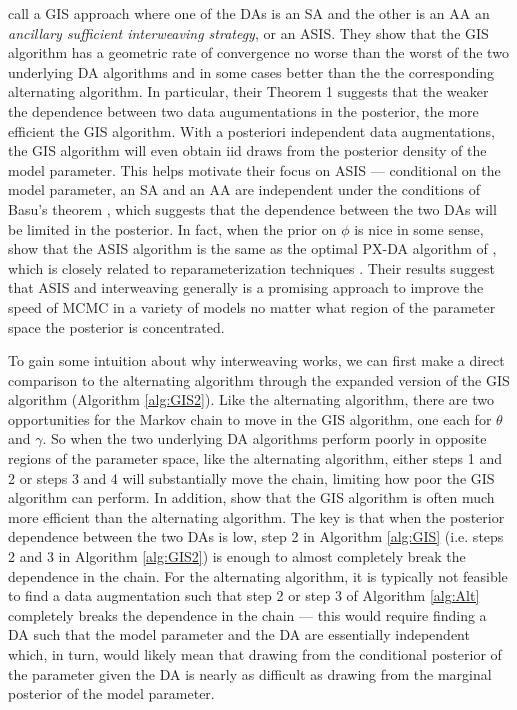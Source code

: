 \documentclass{article}
\begin{document}
 call a GIS approach where one of the DAs is an SA and the other is an AA an {\it ancillary sufficient interweaving strategy}, or an ASIS. They show that the GIS algorithm has a geometric rate of convergence no worse than the worst of the two underlying DA algorithms and in some cases better than the the corresponding alternating algorithm. In particular, their Theorem 1 suggests that the weaker the dependence between two data augumentations in the posterior, the more efficient the GIS algorithm. With a posteriori independent data augmentations, the GIS algorithm will even obtain iid draws from the posterior density of the model parameter. This helps motivate their focus on ASIS --- conditional on the model parameter, an SA and an AA are independent under the conditions of Basu's theorem \cite{basu1955statistics}, which suggests that the dependence between the two DAs will be limited in the posterior. In fact, when the prior on $\phi$ is nice in some sense,  show that the ASIS algorithm is the same as the optimal PX-DA algorithm of , which is closely related to reparameterization techniques  \cite{hobert2008theoretical}. Their results suggest that ASIS and interweaving generally is a promising approach to improve the speed of MCMC in a variety of models no matter what region of the parameter space the posterior is concentrated. 

To gain some intuition about why interweaving works, we can first make a direct comparison to the alternating algorithm through the expanded version of the GIS algorithm (Algorithm \ref{alg:GIS2}). Like the alternating algorithm, there are two opportunities for the Markov chain to move in the GIS algorithm, one each for $\theta$ and $\gamma$. So when the two underlying DA algorithms perform poorly in opposite regions of the parameter space, like the alternating algorithm, either steps 1 and 2 or steps 3 and 4 will substantially move the chain, limiting how poor the GIS algorithm can perform. In addition,  show that the GIS algorithm is often much more efficient than the alternating algorithm. The key is that when the posterior dependence between the two DAs is low, step 2 in Algorithm \ref{alg:GIS} (i.e. steps 2 and 3 in Algorithm \ref{alg:GIS2}) is enough to almost completely break the dependence in the chain. For the alternating algorithm, it is typically not feasible to find a data augmentation such that step 2 or step 3 of Algorithm \ref{alg:Alt} completely breaks the dependence in the chain --- this would require finding a DA such that the model parameter and the DA are essentially independent which, in turn, would likely mean that drawing from the conditional posterior of the parameter given the DA is nearly as difficult as drawing from the marginal posterior of the model parameter.
\end{document}
